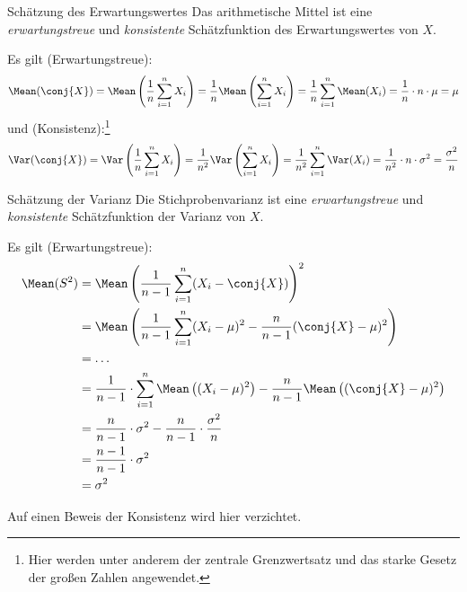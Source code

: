 \begin{example}{Schätzung des Erwartungswertes}
    Das arithmetische Mittel ist eine \emph{erwartungstreue} und \emph{konsistente} Schätzfunktion des Erwartungswertes von $X$.

    Es gilt (Erwartungstreue):
    \[
        \Mean(\conj{X}) = \Mean \left(\frac{1}{n} \sum_{i=1}^n X_i \right) = \frac{1}{n} \Mean \left(\sum_{i=1}^n X_i \right) = \frac{1}{n} \sum_{i=1}^n \Mean(X_i) = \frac{1}{n} \cdot n \cdot \mu = \mu
    \]
    und (Konsistenz):\footnote{Hier werden unter anderem der zentrale Grenzwertsatz und das starke Gesetz der großen Zahlen angewendet.}
    \[
        \Var(\conj{X}) = \Var \left(\frac{1}{n} \sum_{i=1}^n X_i \right) = \frac{1}{n^2} \Var \left( \sum_{i=1}^n X_i \right) = \frac{1}{n^2} \sum_{i=1}^{n} \Var(X_i) = \frac{1}{n^2} \cdot n \cdot \sigma^2 = \frac{\sigma^2}{n}
    \]
\end{example}

\begin{example}{Schätzung der Varianz}
    Die Stichprobenvarianz ist eine \emph{erwartungstreue} und \emph{konsistente} Schätzfunktion der Varianz von $X$.

    Es gilt (Erwartungstreue):
    \begin{alignat*}{1}
        \Mean(S^2) & = \Mean \left( \frac{1}{n-1} \sum_{i=1}^{n} (X_i - \conj{X}) \right)^2                                                          \\
                   & = \Mean \left( \frac{1}{n-1} \sum_{i=1}^{n} (X_i - \mu)^2 - \frac{n}{n-1} (\conj{X} - \mu)^2 \right)                            \\
                   & = \ldots                                                                                                                        \\
                   & = \frac{1}{n-1} \cdot \sum_{i=1}^{n} \Mean \left( (X_i - \mu)^2 \right) - \frac{n}{n-1} \Mean \left( (\conj{X} - \mu)^2 \right) \\
                   & = \frac{n}{n-1} \cdot \sigma^2 - \frac{n}{n-1} \cdot \frac{\sigma^2}{n}                                                         \\
                   & = \frac{n-1}{n-1} \cdot \sigma^2                                                                                                \\
                   & = \sigma^2
    \end{alignat*}

    Auf einen Beweis der Konsistenz wird hier verzichtet.
\end{example}

